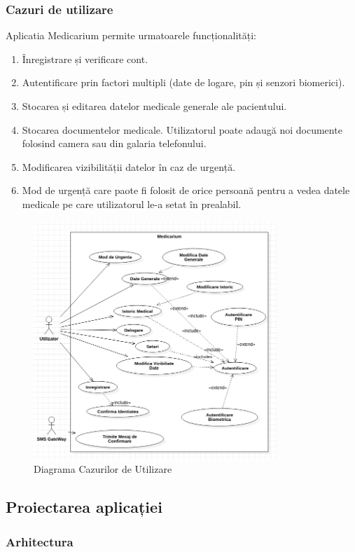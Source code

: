 \documentclass[12pt]{article}
\begin{document}
\newpage
\subsubsection{Cazuri de utilizare}

Aplicatia Medicarium permite urmatoarele funcționalități:

\begin{enumerate}
    \item Înregistrare și verificare cont.
    \item Autentificare prin factori multipli (date de logare, pin și senzori biomerici).
    \item Stocarea și editarea datelor medicale generale ale pacientului.
    \item Stocarea documentelor medicale. Utilizatorul poate adaugă noi documente 
    folosind camera sau din galaria telefonului.
    \item Modificarea vizibilității datelor în caz de urgență.
    \item Mod de urgență care paote fi folosit de orice persoană pentru a vedea
    datele medicale pe care utilizatorul le-a setat în prealabil. 
\end{enumerate}


\begin{figure}[H]
\centering
\includegraphics[height=9cm]{cazuri.png}
\caption{Diagrama Cazurilor de Utilizare}
\end{figure}

\newpage
\subsection{Proiectarea aplicației}
\subsubsection{Arhitectura}
\end{document}
